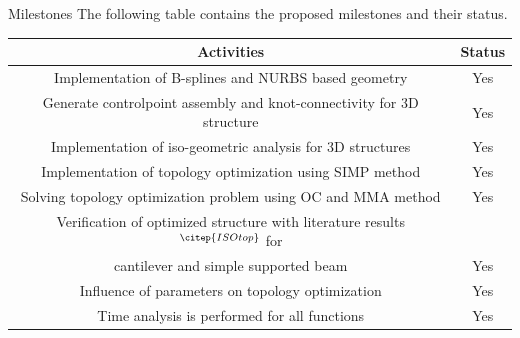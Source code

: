 \documentclass[a4paper,12pt,times]{article}
\begin{document}
\newpage
\begin{section}{Milestones}
The following table contains the proposed milestones and their status.
\begin{center}
\begin{tabular}{ |c|c| } 
\hline
\textbf{Activities} & \textbf{Status} \\
\hline
\hline
Implementation of B-splines and NURBS based geometry & Yes\\
\hline
\hline
Generate controlpoint assembly and knot-connectivity for 3D structure & Yes\\
\hline
\hline
Implementation of iso-geometric analysis for 3D structures & Yes\\
\hline
\hline
Implementation of topology optimization using SIMP method & Yes\\
\hline
\hline
Solving topology optimization problem using OC and MMA method & Yes\\
\hline
\hline
Verification of optimized structure with literature results $^{\citep{ISOtop}}$ for & \\cantilever and simple supported beam& Yes\\
\hline
\hline
Influence of parameters on topology optimization & Yes\\
\hline
\hline
Time analysis is performed for all functions & Yes\\
\hline
\end{tabular}
\end{center}
\end{section}
\end{document}
